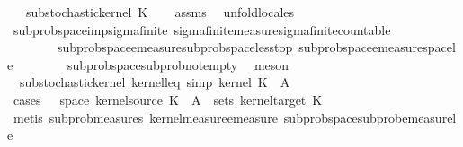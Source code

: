 \begin{isabellebody}
\ \ \ {\isachardoublequoteopen}substochastic{\isacharunderscore}{\kern0pt}kernel\ K{\isachardoublequoteclose}\isanewline
%
\isadelimproof
\ \ %
\endisadelimproof
%
\isatagproof
{}\isamarkupfalse%
\ assms\ \isamarkupfalse%
\ {\isacharparenleft}{\kern0pt}unfold{\isacharunderscore}{\kern0pt}locales{\isacharparenright}{\kern0pt}\isanewline
\ \ \isamarkupfalse%
\ subprob{\isacharunderscore}{\kern0pt}space{\isacharunderscore}{\kern0pt}imp{\isacharunderscore}{\kern0pt}sigma{\isacharunderscore}{\kern0pt}finite\ sigma{\isacharunderscore}{\kern0pt}finite{\isacharunderscore}{\kern0pt}measure{\isachardot}{\kern0pt}sigma{\isacharunderscore}{\kern0pt}finite{\isacharunderscore}{\kern0pt}countable\isanewline
\ \ \ \ \ \ \ \ subprob{\isacharunderscore}{\kern0pt}space{\isachardot}{\kern0pt}emeasure{\isacharunderscore}{\kern0pt}subprob{\isacharunderscore}{\kern0pt}space{\isacharunderscore}{\kern0pt}less{\isacharunderscore}{\kern0pt}top\ subprob{\isacharunderscore}{\kern0pt}space{\isachardot}{\kern0pt}emeasure{\isacharunderscore}{\kern0pt}space{\isacharunderscore}{\kern0pt}le{\isacharunderscore}{\kern0pt}{}\isanewline
\ \ \ \ \ \ \ \ subprob{\isacharunderscore}{\kern0pt}space{\isachardot}{\kern0pt}subprob{\isacharunderscore}{\kern0pt}not{\isacharunderscore}{\kern0pt}empty\ \isamarkupfalse%
\ meson{\isacharplus}{\kern0pt}%
\endisatagproof
{\isafoldproof}%
%
\isadelimproof
\isanewline
%
\endisadelimproof
\isanewline
{}\isamarkupfalse%
\ {\isacharparenleft}{\kern0pt}\ substochastic{\isacharunderscore}{\kern0pt}kernel{\isacharparenright}{\kern0pt}\ kernel{\isacharunderscore}{\kern0pt}leq{\isacharunderscore}{\kern0pt}{}\ {\isacharbrackleft}{\kern0pt}simp{\isacharbrackright}{\kern0pt}{\isacharcolon}{\kern0pt}\ {\isachardoublequoteopen}kernel\ K\ {\isasymomega}\ A{\isacharprime}{\kern0pt}\ {\isasymle}\ {}{\isachardoublequoteclose}\isanewline
%
\isadelimproof
\ \ %
\endisadelimproof
%
\isatagproof
{}\isamarkupfalse%
\ {\isacharparenleft}{\kern0pt}cases\ {\isachardoublequoteopen}{\isasymomega}\ {\isasymin}\ space\ {\isacharparenleft}{\kern0pt}kernel{\isacharunderscore}{\kern0pt}source\ K{\isacharparenright}{\kern0pt}\ {\isasymand}\ A{\isacharprime}{\kern0pt}\ {\isasymin}\ sets\ {\isacharparenleft}{\kern0pt}kernel{\isacharunderscore}{\kern0pt}target\ K{\isacharparenright}{\kern0pt}{\isachardoublequoteclose}{\isacharparenright}{\kern0pt}\isanewline
\ \ \ \isamarkupfalse%
\ {\isacharparenleft}{\kern0pt}metis\ subprob{\isacharunderscore}{\kern0pt}measures\ kernel{\isacharunderscore}{\kern0pt}measure{\isacharunderscore}{\kern0pt}emeasure\ subprob{\isacharunderscore}{\kern0pt}space{\isachardot}{\kern0pt}subprob{\isacharunderscore}{\kern0pt}emeasure{\isacharunderscore}{\kern0pt}le{\isacharunderscore}{\kern0pt}{}{\isacharparenright}{\kern0pt}\isanewline

\end{isabellebody}
